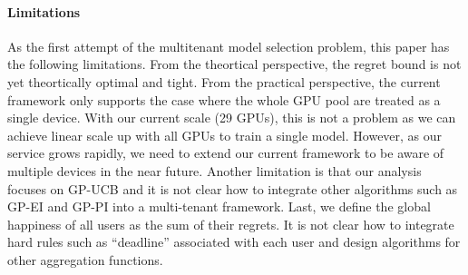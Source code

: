 \paragraph*{Limitations}
As the first attempt
of the multitenant model selection problem,
this paper has the following limitations.
From the theortical perspective, the regret bound
is not yet theortically optimal and tight.
From the practical perspective,
the current framework only supports the case where
the whole GPU pool are treated as a single device.
With our current scale (29 GPUs), this is not
a problem as we can achieve linear scale up
with all GPUs to train a single model. However, as our service grows
rapidly, we need to extend our current framework
to be aware of multiple devices in the near future.
Another limitation is that our
analysis focuses on GP-UCB and it is not clear
how to integrate other algorithms such as
GP-EI and GP-PI into a multi-tenant 
framework. Last, we define the global
happiness of all users as the sum 
of their regrets. It is not clear how to
integrate hard rules such as ``deadline''
associated with each user and design
algorithms for other aggregation functions.